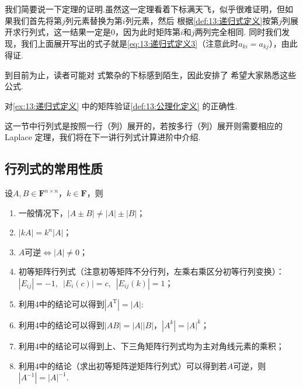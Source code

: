 我们简要说一下定理的证明.虽然这一定理看着下标满天飞，似乎很难证明，但如果我们首先将第$j$列元素替换为第$i$列元素，然后
根据\autoref{def:13:递归式定义}按第$j$列展开求行列式，这一结果一定是0，因为此时矩阵第$i$和$j$两列完全相同.
同时我们发现，我们上面展开写出的式子就是\autoref{eq:13:递归式定义3}（注意此时$a_{ki}=a_{kj}$），由此得证.

到目前为止，读者可能对 式繁杂的下标感到陌生，因此安排了
 希望大家熟悉这些公式.
\begin{example} \label{ex:13:递归式定义2}
    对\autoref{ex:13:递归式定义} 中的矩阵验证\autoref{def:13:公理化定义} 的正确性.
\end{example}
\begin{solution}

\end{solution}

这一节中行列式是按照一行（列）展开的，若按多行（列）展开则需要相应的 Laplace 定理，我们将在下一讲行列式计算进阶中介绍.

\subsection{行列式的常用性质}
设$A,B \in \mathbf{F}^{n \times n}$，$k \in \mathbf{F}$，则
\begin{enumerate}
    \item 一般情况下，$|A \pm B| \neq |A|\pm|B|$；

    \item $|kA|=k^n|A|$；

    \item $A$可逆$\iff |A| \neq 0$；

    \item 初等矩阵行列式（注意初等矩阵不分行列，左乘右乘区分初等行列变换）：$|E_{ij}|=-1,\enspace |E_i(c)|=c,\enspace |E_{ij}(k)|=1$；

    \item 利用4中的结论可以得到$|A^\mathrm{T}|=|A|$:

    \item 利用4中的结论可以得到$|AB|=|A||B|$，$|A^k|=|A|^k$；

    \item 利用4中的结论可以得到上、下三角矩阵行列式均为主对角线元素的乘积；

    \item 利用4中的结论（求出初等矩阵逆矩阵行列式）可以得到若$A$可逆，则$|A^{-1}|=|A|^{-1}$.
\end{enumerate}

